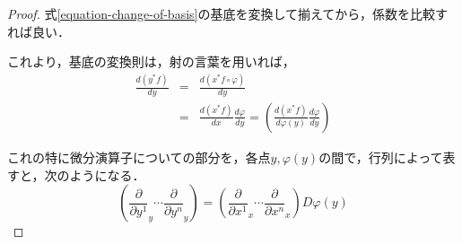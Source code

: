 \documentclass[uplatex, dvipdfmx]{jsreport}
\begin{document}
\begin{proof}式\ref{equation-change-of-basis}の基底を変換して揃えてから，係数を比較すれば良い．
    \begin{center}
    \end{center}
    これより，基底の変換則は，射の言葉を用いれば，
    \begin{eqnarray*}
        \frac{d (y^*f)}{d y} &=& \frac{d (x^*f\circ\varphi)}{d y} \\
        &=& \frac{d (x^*f)}{d x}\frac{d\varphi}{d y} = \left(\frac{d (x^*f)}{d \varphi(y)}\frac{d\varphi}{d y}\right)
    \end{eqnarray*}

    これの特に微分演算子についての部分を，各点$y,\varphi(y)$の間で，行列によって表すと，次のようになる．
    \begin{equation} \left( \frac{\partial}{\partial y^1}_y \cdots \frac{\partial}{\partial y^n}_y \right) = \left( \frac{\partial}{\partial x^1}_x \cdots \frac{\partial}{\partial x^n}_x \right)D\varphi(y) \label{equation-change-of-basis-2}\end{equation}
    

\end{proof}
\end{document}
